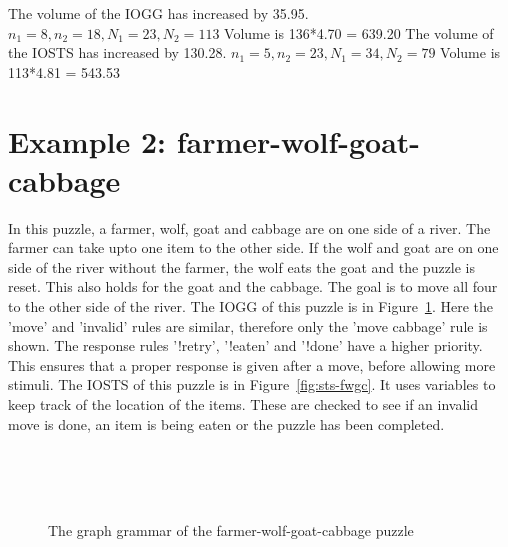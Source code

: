 The volume of the IOGG has increased by 35.95. $n_1 = 8, n_2 = 18, N_1 = 23, N_2 = 113$ Volume is 136*4.70 = 639.20
The volume of the IOSTS has increased by 130.28. $n_1 = 5, n_2 = 23, N_1 = 34, N_2 = 79$ Volume is 113*4.81 = 543.53


\section{Example 2: farmer-wolf-goat-cabbage}
In this puzzle, a farmer, wolf, goat and cabbage are on one side of a river. The farmer can take upto one item to the other side. If the wolf and goat are on one side of the river without the farmer, the wolf eats the goat and the puzzle is reset. This also holds for the goat and the cabbage. The goal is to move all four to the other side of the river. The IOGG of this puzzle is in Figure~\ref{fig:gg-fwgc}. Here the 'move' and 'invalid' rules are similar, therefore only the 'move cabbage' rule is shown. The response rules '!retry', '!eaten' and '!done' have a higher priority. This ensures that a proper response is given after a move, before allowing more stimuli. The IOSTS of this puzzle is in Figure~\ref{fig:sts-fwgc}. It uses variables to keep track of the location of the items. These are checked to see if an invalid move is done, an item is being eaten or the puzzle has been completed.

\begin{figure}[ht]
  \begin{center}
    \hspace{20px}
    \\
    \hspace{20px}
    \\
    \\
  \end{center}
  \caption{The graph grammar of the farmer-wolf-goat-cabbage puzzle}
  \label{fig:gg-fwgc}
\end{figure}

